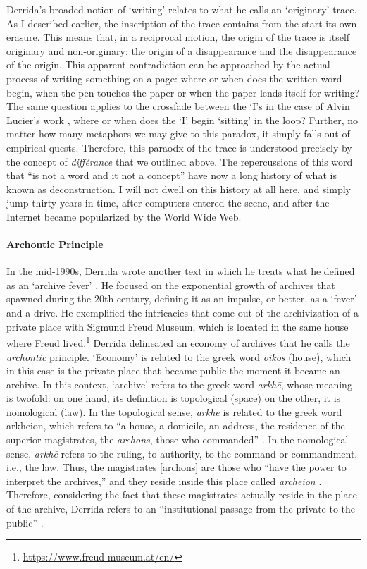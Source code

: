 Derrida's broaded notion of `writing' relates to what he calls an `originary' trace. As I described earlier, the inscription of the trace contains from the start its own erasure. This means that, in a reciprocal motion, the origin of the trace is itself originary and non-originary: the origin of a disappearance and the disappearance of the origin. This apparent contradiction can be approached by the actual process of writing something on a page: where or when does the written word begin, when the pen touches the paper or when the paper lends itself for writing? The same question applies to the crossfade between the `I's in the case of Alvin Lucier's work , where or when does the `I' begin `sitting' in the loop? Further, no matter how many metaphors we may give to this paradox, it simply falls out of empirical quests. Therefore, this paraodx of the trace is understood precisely by the concept of \textit{différance} that we outlined above. The repercussions of this word that ``is not a word and it not a concept'' have now a long history of what is known as deconstruction. I will not dwell on this history at all here, and simply jump thirty years in time, after computers entered the scene, and after the Internet became popularized by the World Wide Web. 

\paragraph{Archontic Principle}
In the mid-1990s, Derrida wrote another text in which he treats what he defined as an `archive fever' \parencite{Der95:Arc}. He focused on the exponential growth of archives that spawned during the 20th century, defining it as an impulse, or better, as a `fever' and a drive. He exemplified the intricacies that come out of the archivization of a private place with Sigmund Freud Museum, which is located in the same house where Freud lived.\footnote{\url{https://www.freud-museum.at/en/}} Derrida delineated an economy of archives that he calls the \textit{archontic} principle. `Economy' is related to the greek word \textit{oikos} (house), which in this case is the private place that became public the moment it became an archive. In this context, `archive' refers to the greek word \textit{arkhē}, whose meaning is twofold: on one hand, its definition is topological (space) on the other, it is nomological (law). In the topological sense, \textit{arkhē} is related to the greek word arkheion, which refers to ``a house, a domicile, an address, the residence of the superior magistrates, the \textit{archons}, those who commanded'' \parencite[9]{Der95:Arc}. In the nomological sense, \textit{arkhē} refers to the ruling, to authority, to the command or commandment, i.e., the law. Thus, the magistrates [archons] are those who ``have the power to interpret the archives,'' and they reside inside this place called \textit{archeion} \parencite[9]{Der95:Arc}. Therefore, considering the fact that these magistrates actually reside in the place of the archive, Derrida refers to an ``institutional passage from the private to the public'' \parencite[9]{Der95:Arc}. 

